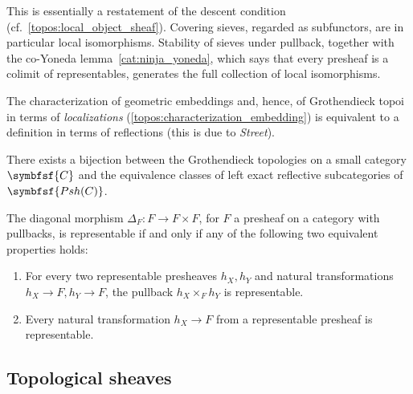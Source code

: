     \begin{remark}
        This is essentially a restatement of the descent condition (cf.~\ref{topos:local_object_sheaf}). Covering sieves, regarded as subfunctors, are in particular local isomorphisms. Stability of sieves under pullback, together with the co-Yoneda lemma~\ref{cat:ninja_yoneda}, which says that every presheaf is a colimit of representables, generates the full collection of local isomorphisms.
    \end{remark}

    The characterization of geometric embeddings and, hence, of Grothendieck topoi in terms of \textit{localizations} (\cref{topos:characterization_embedding}) is equivalent to a definition in terms of reflections (this is due to \textit{Street}).
    \begin{result}
        There exists a bijection between the Grothendieck topologies on a small category $\symbfsf{C}$ and the equivalence classes of left exact reflective subcategories of $\symbfsf{Psh(C)}$.
    \end{result}


    \begin{property}[Diagonals]\label{topos:representable_diagonal}
        The diagonal morphism $\Delta_F:F\rightarrow F\times F$, for $F$ a presheaf on a category with pullbacks, is representable if and only if any of the following two equivalent properties holds:
        \begin{enumerate}
            \item For every two representable presheaves $h_X,h_Y$ and natural transformations $h_X\rightarrow F,h_Y\rightarrow F$, the pullback $h_X\times_Fh_Y$ is representable.
            \item Every natural transformation $h_X\rightarrow F$ from a representable presheaf is representable.
        \end{enumerate}
    \end{property}

\subsection{Topological sheaves}

